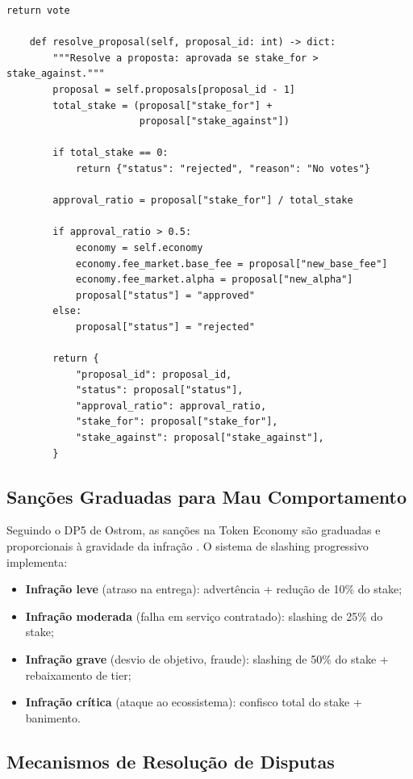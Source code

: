 \begin{lstlisting}[caption={Governanca descentralizada de taxas},
                  label={lst:governanca-taxas}]
        return vote

    def resolve_proposal(self, proposal_id: int) -> dict:
        """Resolve a proposta: aprovada se stake_for > stake_against."""
        proposal = self.proposals[proposal_id - 1]
        total_stake = (proposal["stake_for"] +
                       proposal["stake_against"])

        if total_stake == 0:
            return {"status": "rejected", "reason": "No votes"}

        approval_ratio = proposal["stake_for"] / total_stake

        if approval_ratio > 0.5:
            economy = self.economy
            economy.fee_market.base_fee = proposal["new_base_fee"]
            economy.fee_market.alpha = proposal["new_alpha"]
            proposal["status"] = "approved"
        else:
            proposal["status"] = "rejected"

        return {
            "proposal_id": proposal_id,
            "status": proposal["status"],
            "approval_ratio": approval_ratio,
            "stake_for": proposal["stake_for"],
            "stake_against": proposal["stake_against"],
        }
\end{lstlisting}

\subsection{Sanções Graduadas para Mau Comportamento}

Seguindo o DP5 de Ostrom, as sanções na Token Economy são
graduadas e proporcionais à gravidade da infração
\cite{ostrom1990governing, opencode2026token}. O sistema de
slashing progressivo implementa:

\begin{itemize}
\item \textbf{Infração leve} (atraso na entrega): advertência + 
redução de 10\% do stake;
\item \textbf{Infração moderada} (falha em serviço contratado):
slashing de 25\% do stake;
\item \textbf{Infração grave} (desvio de objetivo, fraude):
slashing de 50\% do stake + rebaixamento de tier;
\item \textbf{Infração crítica} (ataque ao ecossistema):
confisco total do stake + banimento.
\end{itemize}

\subsection{Mecanismos de Resolução de Disputas}

